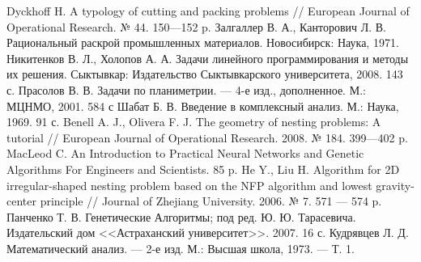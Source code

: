 \documentclass[14pt]{extarticle}
\begin{document}
	\begin{thebibliography}{1}
		 Dyckhoff H. A typology of cutting and packing problems // European Journal of Operational Research. № 44. 150---152 p.
		 Залгаллер В. А., Канторович Л. В. Рациональный раскрой промышленных материалов. Новосибирск: Наука, 1971.
		 Никитенков В. Л., Холопов А. А. Задачи линейного программирования и методы их решения. Сыктывкар: Издательство Сыктывкарского университета, 2008. 143 с.
		  Прасолов В. В. Задачи по планиметрии. --- 4-е изд., дополненное. М.: МЦНМО, 2001. 584 с 
		 Шабат Б. В. Введение в комплексный анализ. М.: Наука, 1969. 91 с.
		 Benell A. J., Olivera F. J. The geometry of nesting problems: A tutorial // European Journal of Operational Research. 2008. № 184. 399---402 p.
		 MacLeod C. An Introduction to Practical Neural Networks and Genetic Algorithms For Engineers and Scientists. 85 p.
		 He Y., Liu H. Algorithm for 2D irregular-shaped nesting problem based on the NFP algorithm and lowest gravity-center principle // Journal of Zhejiang University. 2006. № 7. 571 --- 574 p.
		 Панченко Т. В. Генетические Алгоритмы; под ред. Ю. Ю. Тарасевича. Издательский дом <<Астраханский университет>>. 2007. 16 с.
		 Кудрявцев Л. Д. Математический анализ. — 2-е изд.  М.: Высшая школа, 1973. — Т. 1.
	\end{thebibliography}
\end{document}
